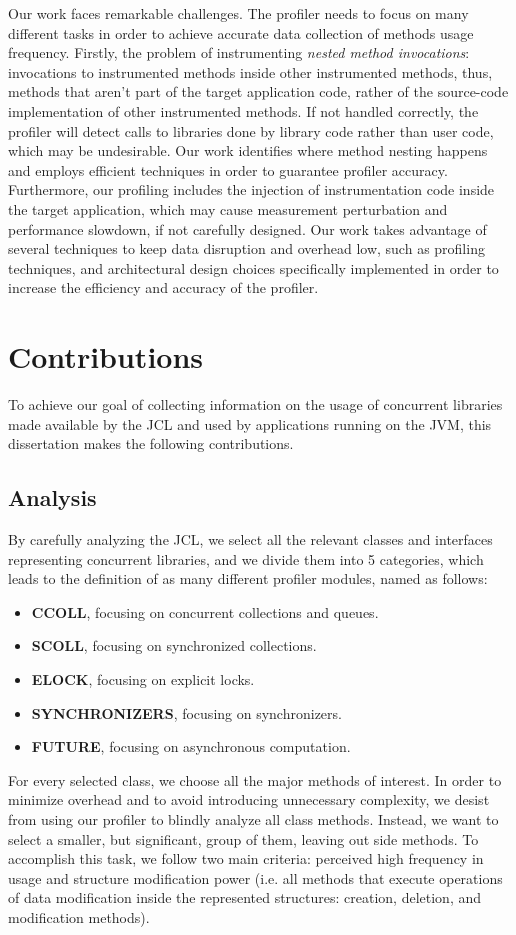 \documentclass[]{usiinfthesis}
\begin{document}
Our work faces remarkable challenges. The profiler needs to focus on many different tasks in order to achieve accurate data collection of methods usage frequency. Firstly, the problem of instrumenting \textit{nested method invocations}:  invocations to instrumented methods inside other instrumented methods, thus, methods that aren’t part of the target application code, rather of the source-code implementation of other instrumented methods. If not handled correctly, the profiler will detect calls to libraries done by library code rather than user code, which may be undesirable. Our work identifies where method nesting happens and employs efficient techniques in order to guarantee profiler accuracy. Furthermore, our profiling includes the injection of instrumentation code inside the target application, which may cause measurement perturbation and performance slowdown, if not carefully designed. Our work takes advantage of several techniques to keep data disruption and overhead low, such as profiling techniques, and architectural design choices specifically implemented in order to increase the efficiency and accuracy of the profiler.


\section{Contributions} \label{sec:1.3}
To achieve our goal of collecting information on the usage of concurrent libraries made available by the JCL and used by applications running on the JVM, this dissertation makes the following contributions.

\subsection{Analysis}
By carefully analyzing  the JCL, we select all the relevant classes and interfaces representing concurrent libraries, and we divide them into 5 categories, which leads to the definition of as many different profiler modules, named as follows:
\begin{itemize}
    \item \textbf{CCOLL}, focusing on concurrent collections and queues.
    \item \textbf{SCOLL}, focusing on synchronized collections.
    \item \textbf{ELOCK}, focusing on explicit locks.
    \item \textbf{SYNCHRONIZERS}, focusing on synchronizers.
    \item \textbf{FUTURE}, focusing on asynchronous computation.
\end{itemize}
For every selected class, we choose all the major methods of interest. In order to minimize overhead and to avoid introducing unnecessary complexity, we desist from using our profiler to blindly analyze all class methods. Instead, we want to select a smaller, but significant, group of them, leaving out side methods. To accomplish this task, we follow two main criteria: perceived high frequency in usage and structure modification power (i.e. all methods that execute operations of data modification inside the represented structures: creation, deletion, and modification methods).
\end{document}
